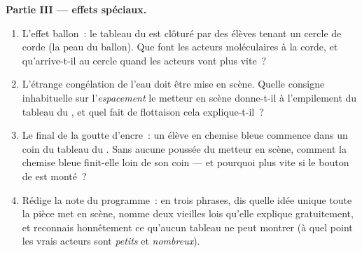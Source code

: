 \begin{problem}
\medskip\noindent\textbf{Partie III --- effets spéciaux.}
\begin{enumerate}[resume]
  \item L'effet ballon~: le tableau du  est clôturé par des
        élèves tenant un cercle de corde (la peau du ballon). Que
        font les acteurs moléculaires à la corde, et qu'arrive-t-il
        au cercle quand les acteurs vont plus vite~?
  \item L'étrange congélation de l'eau doit être mise en scène.
        Quelle consigne inhabituelle sur l'\emph{espacement} le
        metteur en scène donne-t-il à l'empilement du tableau du
        , et quel fait de flottaison cela explique-t-il~?
  \item Le final de la goutte d'encre~: un élève en chemise bleue
        commence dans un coin du tableau du \emph{}. Sans
        aucune poussée du metteur en scène, comment la chemise
        bleue finit-elle loin de son coin --- et pourquoi plus vite
        si le bouton de  est monté~?
  \item Rédige la note du programme~: en trois phrases, dis quelle
        idée unique toute la pièce met en scène, nomme deux
        vieilles lois qu'elle explique gratuitement, et reconnais
        honnêtement ce qu'aucun tableau ne peut montrer (à quel
        point les vrais acteurs sont \emph{petits} et \emph{nombreux}).
\end{enumerate}
\end{problem}
